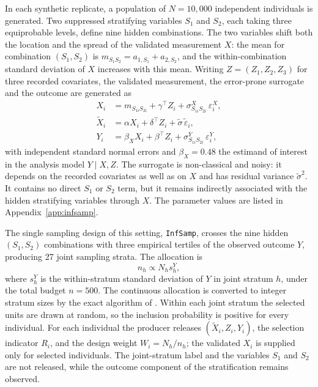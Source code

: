 In each synthetic replicate, a population of $N = 10{,}000$ independent individuals is generated. Two suppressed stratifying variables $S_1$ and $S_2$, each taking three equiprobable levels, define nine hidden combinations. The two variables shift both the location and the spread of the validated measurement $X$: the mean for combination $(S_1,S_2)$ is $m_{S_1 S_2} = a_{1,S_1} + a_{2,S_2}$, and the within-combination standard deviation of $X$ increases with this mean. Writing $Z = (Z_1, Z_2, Z_3)$ for three recorded covariates, the validated measurement, the error-prone surrogate and the outcome are generated as
\begin{align}
X_i &= m_{S_{1i} S_{2i}} + \gamma^\top Z_i + \sigma^X_{S_{1i} S_{2i}}\,\varepsilon^X_i, \label{eq:infsamp_X}\\
\tilde{X}_i &= \alpha X_i + \delta^\top Z_i + \tilde{\sigma}\,\tilde{\varepsilon}_i, \label{eq:infsamp_surr}\\
Y_i &= \beta_X X_i + \beta^\top Z_i + \sigma^Y_{S_{1i} S_{2i}}\,\varepsilon^Y_i, \label{eq:infsamp_Y}
\end{align}
with independent standard normal errors and $\beta_X = 0.48$ the estimand of interest in the analysis model $Y \mid X, Z$. The surrogate is non-classical and noisy: it depends on the recorded covariates as well as on $X$ and has residual variance $\tilde{\sigma}^2$. It contains no direct $S_1$ or $S_2$ term, but it remains indirectly associated with the hidden stratifying variables through $X$. The parameter values are listed in Appendix~\ref{app:infsamp}.

The single sampling design of this setting, \texttt{InfSamp}, crosses the nine hidden $(S_1,S_2)$ combinations with three empirical tertiles of the observed outcome $Y$, producing 27 joint sampling strata. The allocation is
\[
n_h \propto N_h s^Y_h,
\]
where $s^Y_h$ is the within-stratum standard deviation of $Y$ in joint stratum $h$, under the total budget $n=500$. The continuous allocation is converted to integer stratum sizes by the exact algorithm of \citet{wright2017exact}. Within each joint stratum the selected units are drawn at random, so the inclusion probability is positive for every individual. For each individual the producer releases $(\tilde{X}_i, Z_i, Y_i)$, the selection indicator $R_i$, and the design weight $W_i = N_h / n_h$; the validated $X_i$ is supplied only for selected individuals. The joint-stratum label and the variables $S_1$ and $S_2$ are not released, while the outcome component of the stratification remains observed.

